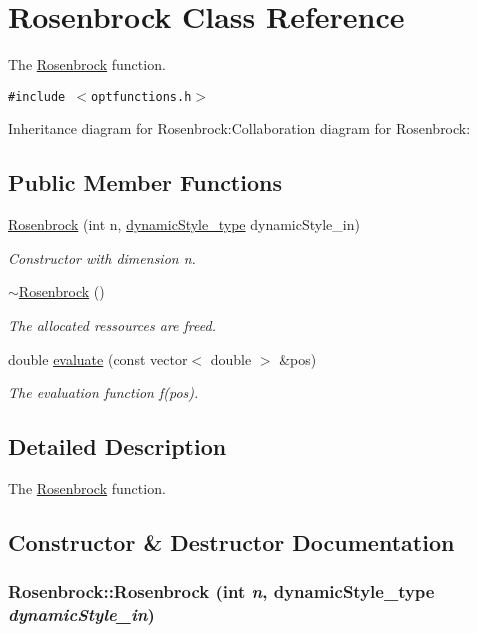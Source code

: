 \hypertarget{classRosenbrock}{
\section{Rosenbrock Class Reference}
\label{classRosenbrock}
}
The \hyperlink{classRosenbrock}{Rosenbrock} function.  


{\tt \#include $<$optfunctions.h$>$}

Inheritance diagram for Rosenbrock:Collaboration diagram for Rosenbrock:\subsection*{Public Member Functions}
\begin{CompactItemize}
\item 
\hyperlink{classRosenbrock_f4274741532e7e4661301e8e2cad7c34}{Rosenbrock} (int n, \hyperlink{optfunctions_8h_ae9aa3a5dd199a43e77abc2cccf4477e}{dynamicStyle\_\-type} dynamicStyle\_\-in)
\begin{CompactList}\small\item\em Constructor with dimension n. \item\end{CompactList}\item 
\hyperlink{classRosenbrock_41def89ef4fbd061d40bb4b1a3ee2423}{$\sim$Rosenbrock} ()
\begin{CompactList}\small\item\em The allocated ressources are freed. \item\end{CompactList}\item 
double \hyperlink{classRosenbrock_2f19302aa06dd22a427291ed3af6ce1c}{evaluate} (const vector$<$ double $>$ \&pos)
\begin{CompactList}\small\item\em The evaluation function f(pos). \item\end{CompactList}\end{CompactItemize}


\subsection{Detailed Description}
The \hyperlink{classRosenbrock}{Rosenbrock} function. 

\subsection{Constructor \& Destructor Documentation}
\hypertarget{classRosenbrock_f4274741532e7e4661301e8e2cad7c34}{
\subsubsection{\setlength{\rightskip}{0pt plus 5cm}Rosenbrock::Rosenbrock (int {\em n}, \/  {\bf dynamicStyle\_\-type} {\em dynamicStyle\_\-in})}}
\label{classRosenbrock_f4274741532e7e4661301e8e2cad7c34}


